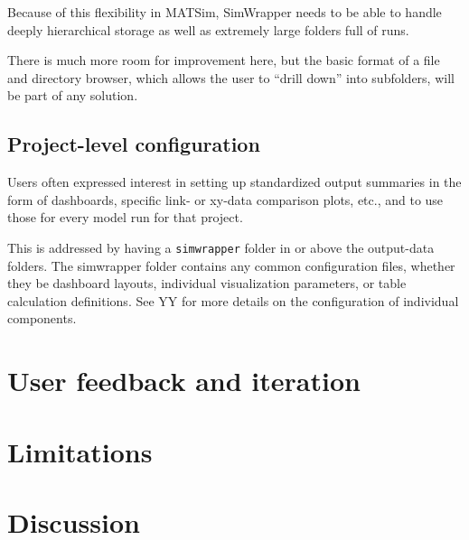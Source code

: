 Because of this flexibility in MATSim, SimWrapper needs to be able to
handle deeply hierarchical storage as well as extremely large folders
full of runs.

There is much more room for improvement here, but the basic format of a
file and directory browser, which allows the user to ``drill down'' into
subfolders, will be part of any solution.

\hypertarget{project-level-configuration}{%
\subsection{Project-level
configuration}\label{project-level-configuration}}

Users often expressed interest in setting up standardized output
summaries in the form of dashboards, specific link- or xy-data
comparison plots, etc., and to use those for every model run for that
project.

This is addressed by having a \texttt{simwrapper} folder in or above the
output-data folders. The simwrapper folder contains any common
configuration files, whether they be dashboard layouts, individual
visualization parameters, or table calculation definitions. See YY for
more details on the configuration of individual components.

\hypertarget{user-feedback-and-iteration}{%
\section{User feedback and
iteration}\label{simwrapper-user-feedback}}

\hypertarget{limitations}{%
\section{Limitations}\label{simwrapper-limitations}}

\hypertarget{discussion}{%
\section{Discussion}\label{simwrapper-discussion}}
